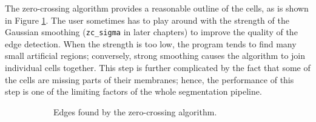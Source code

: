 \documentclass[
  digital,     %
  oneside,     %
  nosansbold,  %
  nocolorbold, %
  lof,         %
  lot,         %
]{fithesis4}
\begin{document}
The zero-crossing algorithm provides a reasonable outline of the cells, as is
shown in Figure \ref{fig:zc}. The user sometimes has to play around with
the strength of the Gaussian smoothing (\texttt{zc\_sigma} in later chapters) to improve the quality of the edge detection. When the strength is too low, the program tends to find many small artificial regions; conversely, strong smoothing causes the algorithm to join individual cells together. 
This step is further complicated by the fact that some of the cells are missing parts of
their membranes; hence, the performance of this step is one of the limiting factors of
the whole segmentation pipeline.

\begin{figure}
    \begin{subfigure}[t]{0.45\textwidth}
        \caption{Edges found by the zero-crossing algorithm.}
        \label{fig:zc}
    \end{subfigure}
    \begin{subfigure}[t]{0.45\textwidth}

\end{subfigure}
\end{figure}
\end{document}
